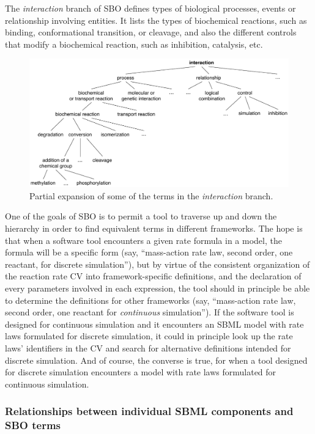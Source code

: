 The \emph{interaction} branch of SBO defines types of biological
processes, events or relationship involving entities.  It lists
the types of biochemical reactions, such as binding,
conformational transition, or cleavage, and also the different
controls that modify a biochemical reaction, such as inhibition,
catalysis, etc.

\begin{figure}[tbh]
  \centering
  \includegraphics[scale = 0.82]{figs/sbo-interaction}
  \caption{Partial expansion of some of the terms in the \emph{interaction} branch.}
  \label{fig:sbo-interaction}
\end{figure}

One of the goals of SBO is to permit a tool to traverse up and
down the hierarchy in order to find equivalent terms in different
frameworks.  The hope is that when a software tool encounters a
given rate formula in a model, the formula will be a specific form
(say, ``mass-action rate law, second order, one reactant, for
discrete simulation''), but by virtue of the consistent
organization of the reaction rate CV into framework-specific
definitions, and the declaration of every parameters involved in
each expression, the tool should in principle be able to determine
the definitions for other frameworks (say, ``mass-action rate law,
second order, one reactant for \emph{continuous} simulation'').
If the software tool is designed for continuous simulation and it
encounters an SBML model with rate laws formulated for discrete
simulation, it could in principle look up the rate laws'
identifiers in the CV and search for alternative definitions
intended for discrete simulation.  And of course, the converse is
true, for when a tool designed for discrete simulation encounters
a model with rate laws formulated for continuous simulation.


\subsubsection{Relationships between individual SBML components and SBO terms}

